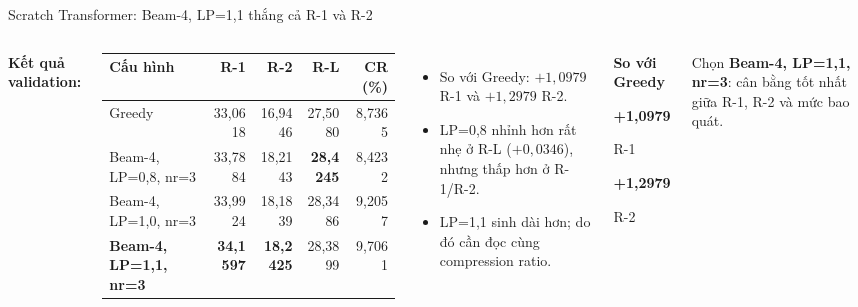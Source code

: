 \documentclass[aspectratio=169,10pt]{beamer}
\newcommand{\selectedrow}{\rowcolor{SoftYellow}}
\newcommand{\tightitems}{\setlength{\itemsep}{2.0pt}\setlength{\parskip}{0pt}}
\begin{document}
\begin{frame}{Scratch Transformer: Beam-4, LP=1,1 thắng cả R-1 và R-2}
  \begin{columns}[T,onlytextwidth]
      \textbf{Kết quả validation:}
      \vspace{1mm}
      \small
      \setlength{\tabcolsep}{3.4pt}
      \begin{tabular}{lrrrr}
        \toprule
        \textbf{Cấu hình} & \textbf{R-1} & \textbf{R-2} & \textbf{R-L} & \textbf{CR (\%)}\\
        \midrule
        Greedy & 33,0618 & 16,9446 & 27,5080 & 8,7365\\
        Beam-4, LP=0,8, nr=3 & 33,7884 & 18,2143 & \textbf{28,4245} & 8,4232\\
        Beam-4, LP=1,0, nr=3 & 33,9924 & 18,1839 & 28,3486 & 9,2057\\
        \selectedrow
        \textbf{Beam-4, LP=1,1, nr=3} & \textbf{34,1597} & \textbf{18,2425} & 28,3899 & 9,7061\\
        \bottomrule
      \end{tabular}
      \vspace{1.5mm}
      \begin{itemize}\footnotesize\tightitems
        \item So với Greedy: $+1{,}0979$ R-1 và $+1{,}2979$ R-2.
        \item LP=0,8 nhỉnh hơn rất nhẹ ở R-L ($+0{,}0346$), nhưng thấp hơn ở R-1/R-2.
        \item LP=1,1 sinh dài hơn; do đó cần đọc cùng compression ratio.
      \end{itemize}
      \begin{softbox}
        \centering\scriptsize
        \textbf{So với Greedy}\par\vspace{1mm}
        {\color{DeepBlue}\Large\bfseries +1,0979}\par R-1\par\vspace{1mm}
        {\color{DeepBlue}\Large\bfseries +1,2979}\par R-2
      \end{softbox}
      \vspace{2mm}
      \begin{keymessage}
        \scriptsize Chọn \textbf{Beam-4, LP=1,1, nr=3}: cân bằng tốt nhất giữa R-1, R-2 và mức bao quát.
      \end{keymessage}
  \end{columns}
\end{frame}
\end{document}
